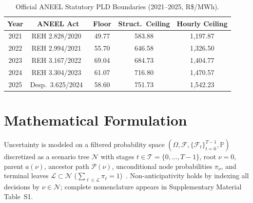 \documentclass[10pt,journal]{IEEEtran}
\begin{document}
\begin{table}[t]
\centering
\caption{Official ANEEL Statutory PLD Boundaries (2021--2025, R\$/MWh).}
\label{tab:pld_bounds}
\scriptsize
\setlength{\tabcolsep}{4pt}
\begin{tabular}{ccccc}
\toprule
Year & ANEEL Act & Floor & Struct.\ Ceiling & Hourly Ceiling \\
\midrule
2021 & REH 2.828/2020~\cite{ANEEL_REH2828_2020} & 49.77 & 583.88 & 1,197.87 \\
2022 & REH 2.994/2021~\cite{ANEEL_REH2994_2021} & 55.70 & 646.58 & 1,326.50 \\
2023 & REH 3.167/2022~\cite{ANEEL_REH3167_2022} & 69.04 & 684.73 & 1,404.77 \\
2024 & REH 3.304/2023~\cite{ANEEL_REH3304_2023} & 61.07 & 716.80 & 1,470.57 \\
2025 & Desp.\ 3.625/2024~\cite{ANEEL_Despacho3625_2024} & 58.60 & 751.73 & 1,542.23 \\
\bottomrule
\end{tabular}
\end{table}

\section{Mathematical Formulation}
\label{sec:math}

Uncertainty is modeled on a filtered probability space $(\Omega, \mathcal{F}, \{\mathcal{F}_t\}_{t=0}^{T-1}, \mathbb{P})$ discretized as a scenario tree $\mathcal{N}$ with stages $t \in \mathcal{T} = \{0, \dots, T-1\}$, root $\nu = 0$, parent $a(\nu)$, ancestor path $\mathcal{P}(\nu)$, unconditional node probabilities $\pi_\nu$, and terminal leaves $\mathcal{L} \subset \mathcal{N}$ ($\sum_{\ell \in \mathcal{L}} \pi_\ell = 1$)~\cite{BirgeLouveaux2011,Shapiro2021}. Non-anticipativity holds by indexing all decisions by $\nu \in \mathcal{N}$; complete nomenclature appears in Supplementary Material Table~S1.
\end{document}
